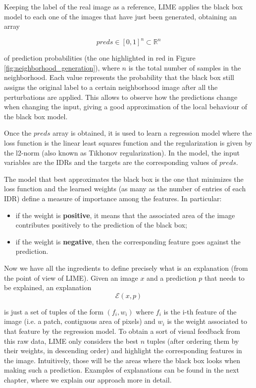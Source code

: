 \documentclass[12pt, twoside, a4paper]{report}
\begin{document}
Keeping the label of the real image as a reference, LIME applies the black box model to each one of the images that have just been generated, obtaining an array 

\[
	preds \in  [0, 1]^{n}\subset \mathbb{R}^{n}
\]

of prediction probabilities (the one highlighted in red in Figure \ref{fig:neighborhood_generation}), where $n$ is the total number of samples in the neighborhood. Each value represents the probability that the black box still assigns the original label to a certain neighborhood image after all the perturbations are applied.
This allows to observe how the predictions change when changing the input, giving a good approximation of the local behaviour of the black box model.

Once the $preds$ array is obtained, it is used to learn a regression model where the loss function is the linear least squares function and the regularization is given by the l2-norm (also known as Tikhonov regularization). In the model, the input variables are the IDRs and the targets are the corresponding values of $preds$.
 
The model that best approximates the black box is the one that minimizes the loss function and the learned weights (as many as the number of entries of each IDR) define a measure of importance among the features. In particular:

\begin{itemize}
\item if the weight is \textbf{positive}, it means that the associated area of the image contributes positively to the prediction of the black box;
\item if the weight is \textbf{negative}, then the corresponding feature goes against the prediction.
\end{itemize}

Now we have all the ingredients to define precisely what is an explanation (from the point of view of LIME). Given an image $x$ and a prediction $p$ that needs to be explained, an explanation 
\[
	\mathcal{E}(x,p)
\]

is just a set of tuples of the form $(f_{i},w_{i})$ where $f_{i}$ is the i-th feature of the image (i.e. a patch, contiguous area of pixels) and $w_{i}$ is the weight associated to that feature by the regression model. To obtain a sort of visual feedback from this raw data, LIME only considers the best $n$ tuples (after ordering them by their weights, in descending order) and highlight the corresponding features in the image. Intuitively, those will be the areas where the black box looks when making such a prediction. Examples of explanations can be found in the next chapter, where we explain our approach more in detail.
\end{document}
